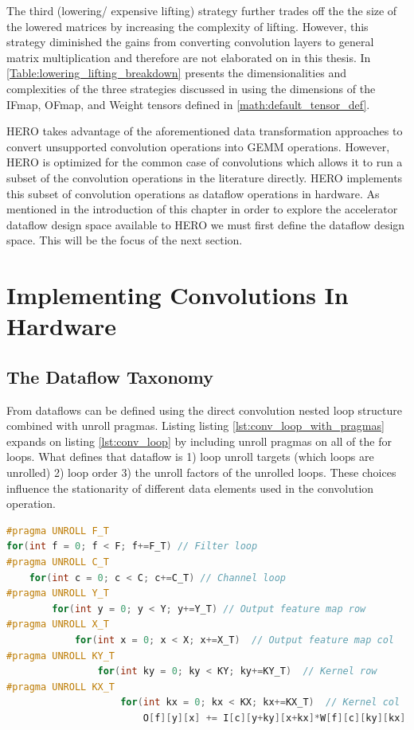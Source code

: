 The third (lowering/ expensive lifting) strategy further trades off the
the size of the lowered matrices by increasing the complexity of lifting.
However, this strategy diminished the gains from converting convolution layers
to general matrix multiplication and therefore are not elaborated on in this
thesis. In \autoref{Table:lowering_lifting_breakdown} presents the
dimensionalities and complexities of the three strategies discussed in
\cite{cafe_con_troll} using the dimensions of the IFmap, OFmap, and Weight
tensors defined in \autoref{math:default_tensor_def}.

HERO takes advantage of the aforementioned data transformation approaches to
convert unsupported convolution operations into GEMM operations. However, HERO
is optimized for the common case of convolutions which allows it to run a subset
of the convolution operations in the literature directly. HERO implements this
subset of convolution operations as dataflow operations in hardware. As
mentioned in the introduction of this chapter in order to explore the
accelerator dataflow design space available to HERO we must first define the
dataflow design space. This will be the focus of the next section.  

    
\section{Implementing Convolutions In Hardware}
\subsection{The Dataflow Taxonomy}


From \cite{dnn_df_overrated} 
dataflows can be defined using the direct convolution
nested loop structure combined with unroll pragmas. Listing
listing \ref{lst:conv_loop_with_pragmas} expands on listing \ref{lst:conv_loop}
by including unroll pragmas on all of the for loops. What defines that dataflow is 1) loop unroll
targets (which loops are unrolled) 2) loop order 3) the unroll factors of the
unrolled loops. These choices influence the stationarity of different data
elements used in the convolution operation. 


\begin{minipage}{\linewidth}
    \begin{lstlisting}[language=C, caption=Convolution implemented as nested loops, label={lst:conv_loop_with_pragmas}]
#pragma UNROLL F_T
for(int f = 0; f < F; f+=F_T) // Filter loop
#pragma UNROLL C_T
    for(int c = 0; c < C; c+=C_T) // Channel loop
#pragma UNROLL Y_T
        for(int y = 0; y < Y; y+=Y_T) // Output feature map row
#pragma UNROLL X_T
            for(int x = 0; x < X; x+=X_T)  // Output feature map col
#pragma UNROLL KY_T
                for(int ky = 0; ky < KY; ky+=KY_T)  // Kernel row
#pragma UNROLL KX_T
                    for(int kx = 0; kx < KX; kx+=KX_T)  // Kernel col
                        O[f][y][x] += I[c][y+ky][x+kx]*W[f][c][ky][kx];
    \end{lstlisting}
\end{minipage}


